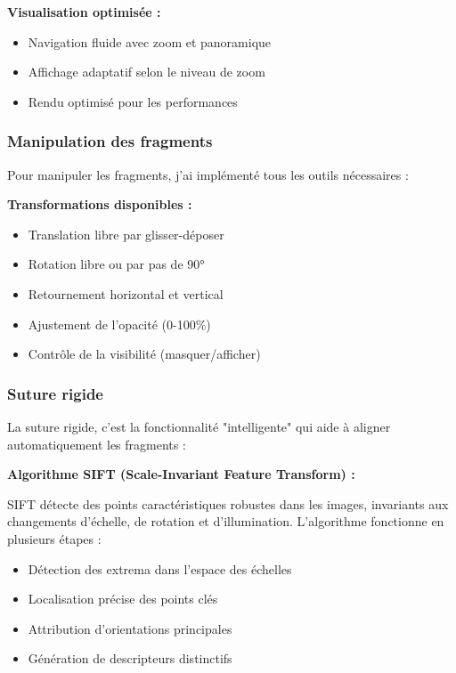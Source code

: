 \documentclass[11pt,a4paper]{report}
\begin{document}
\textbf{Visualisation optimisée :}
\begin{itemize}
\item Navigation fluide avec zoom et panoramique
\item Affichage adaptatif selon le niveau de zoom
\item Rendu optimisé pour les performances
\end{itemize}

\subsubsection{Manipulation des fragments}

Pour manipuler les fragments, j'ai implémenté tous les outils nécessaires :

\textbf{Transformations disponibles :}
\begin{itemize}
\item Translation libre par glisser-déposer
\item Rotation libre ou par pas de 90°
\item Retournement horizontal et vertical
\item Ajustement de l'opacité (0-100\%)
\item Contrôle de la visibilité (masquer/afficher)
\end{itemize}

\subsubsection{Suture rigide}

La suture rigide, c'est la fonctionnalité "intelligente" qui aide à aligner automatiquement les fragments :

\textbf{Algorithme SIFT (Scale-Invariant Feature Transform) :}

SIFT détecte des points caractéristiques robustes dans les images, invariants aux changements d'échelle, de rotation et d'illumination. L'algorithme fonctionne en plusieurs étapes :

\begin{itemize}
\item Détection des extrema dans l'espace des échelles
\item Localisation précise des points clés
\item Attribution d'orientations principales
\item Génération de descripteurs distinctifs
\end{itemize}
\end{document}
